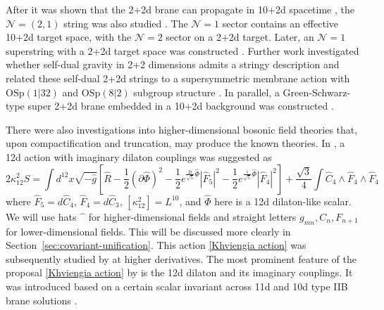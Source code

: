 After it was shown that the 2+2d brane can propagate in 10+2d spacetime \cite{Blencowe:1988sk}, the $\mathcal{N}=(2,1)$ string was also studied \cite{Kutasov:1996fp,Kutasov:1996zm,Martinec:1996wn}. The $\mathcal{N}=1$ sector contains an effective 10+2d target space, with the $\mathcal{N}=2$ sector on a 2+2d target.
Later, an $\mathcal{N}=1$ superstring with a 2+2d target space was constructed \cite{Khviengia:1995pm,Lu:1995pn}.
Further work investigated whether self-dual gravity in 2+2 dimensions admits a stringy description \cite{Sezgin:1995fj} and related these self-dual 2+2d strings to a supersymmetric membrane action with $\mathrm{OSp}(1|32)$ and $\mathrm{OSp}(8|2)$ subgroup structure \cite{Ketov:1996gr}.
In parallel, a Green-Schwarz-type super 2+2d brane embedded in a 10+2d background was constructed \cite{Hewson:1996yh,Hewson:1997wv,Hewson:1998sw}.

There were also investigations into higher-dimensional bosonic field theories that, upon compactification and truncation, may produce the known theories.
In \cite{Khviengia:1997rh}, a 12d action with imaginary dilaton couplings was suggested as
\begin{equation}
2\kappa_{12}^2S
=\int d^{12}x\sqrt{-\widehat{g}}
\left[
\widehat R-\frac{1}{2}(\partial\widehat{\Phi})^2
-\frac{1}{2}e^{\frac{2i}{\sqrt{5}}\widehat{\Phi}}|\widehat{F}_5|^2
-\frac{1}{2}e^{\frac{i}{\sqrt{5}}\widehat{\Phi}}|\widehat{F}_4|^2
\right]
+\frac{\sqrt{3}}{4}\int \widehat{C}_4\wedge \widehat{F}_4 \wedge \widehat{F}_4
\label{Khviengia action}
\end{equation}
where $\widehat{F}_5 = d\widehat{C}_4$, $\widehat{F}_4 = d\widehat{C}_3$, $[\kappa_{12}^2]=L^{10}$, and $\widehat{\Phi}$ here is a 12d dilaton-like scalar.
We will use hats $\widehat{\phantom{x}}$ for higher-dimensional fields and straight letters $g_{mn},C_n,F_{n+1}$ for lower-dimensional fields. 
This will be discussed more clearly in Section~\ref{sec:covariant-unification}.
This action \eqref{Khviengia action} was subsequently studied by \cite{Bakhtiarizadeh:2018upg} at higher derivatives.
The most prominent feature of the proposal \eqref{Khviengia action} by \cite{Khviengia:1997rh} is the 12d dilaton and its imaginary couplings.
It was introduced based on a certain scalar invariant \cite{Lu:1995cs} across 11d and 10d type IIB brane solutions \cite{Khviengia:1997rh}.

